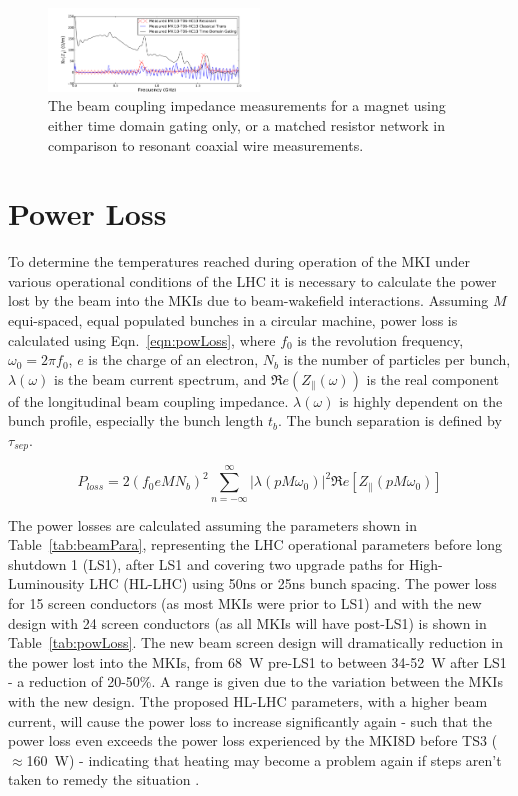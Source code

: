 \documentclass[a4paper,
              ]{jacow}
\begin{document}
\begin{figure}
\includegraphics[width=0.5\textwidth]{TUPRI030f5.pdf}
\caption{The beam coupling impedance measurements for a magnet using either time domain gating only, or a matched resistor network in comparison to resonant coaxial wire measurements.}
\label{fig:measComp}
\end{figure}

\section{Power Loss}

To determine the temperatures reached during operation of the MKI under various operational conditions of the LHC it is necessary to calculate the power lost by the beam into the MKIs due to beam-wakefield interactions. Assuming $M$ equi-spaced, equal populated bunches in a circular machine, power loss is calculated using Eqn.~\ref{eqn:powLoss}, where $f_{0}$ is the revolution frequency, $\omega_{0}=2\pi f_{0}$, $e$ is the charge of an electron, $N_{b}$ is the number of particles per bunch, $\lambda(\omega)$ is the beam current spectrum, and $\Re{}e(Z_{\parallel}(\omega))$ is the real component of the longitudinal beam coupling impedance. $\lambda(\omega)$ is highly dependent on the bunch profile, especially the bunch length $t_{b}$. The bunch separation is defined by $\tau_{sep}$.

\begin{equation}
P_{loss} = 2 \left( f_{0} e M  N_{b}\right)^{2} \displaystyle\sum\limits_{n = -\infty}^{\infty}  \left| \lambda \left( p M \omega_{0} \right)  \right|^{2} \Re{}e \left[ Z_{\parallel} \left( p M \omega_{0} \right) \right]
\label{eqn:powLoss}
\end{equation}

The power losses are calculated assuming the parameters shown in Table~\ref{tab:beamPara}, representing the LHC operational parameters before long shutdown 1 (LS1), after LS1 and covering two  upgrade paths for High-Luminousity LHC (HL-LHC) using 50ns or 25ns bunch spacing. The power loss for 15 screen conductors (as most MKIs were prior to LS1) and with the new design with 24 screen conductors (as all MKIs will have post-LS1) is shown in Table~\ref{tab:powLoss}. The new beam screen design will dramatically reduction in the power lost into the MKIs, from 68~W pre-LS1 to between 34-52~W after LS1 - a reduction of 20-50\%. A range is given due to the variation between the MKIs with the new design. Tthe proposed HL-LHC parameters, with a higher beam current, will cause the power loss to increase significantly again - such that the power loss even exceeds the power loss experienced by the MKI8D before TS3 ($\approx$160~W) - indicating that heating may become a problem again if steps aren't taken to remedy the situation \cite{mkiCoolling}.
\end{document}
